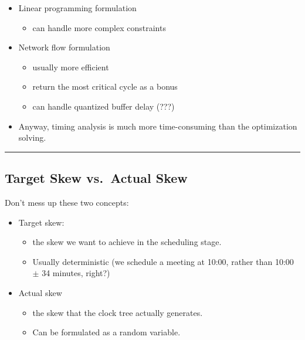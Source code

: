 \documentclass[
]{article}
\providecommand{\tightlist}{%
  \setlength{\itemsep}{0pt}\setlength{\parskip}{0pt}}
\begin{document}
\begin{itemize}
\tightlist
\item
  Linear programming formulation

  \begin{itemize}
  \tightlist
  \item
    can handle more complex constraints
  \end{itemize}
\item
  Network flow formulation

  \begin{itemize}
  \tightlist
  \item
    usually more efficient
  \item
    return the most critical cycle as a bonus
  \item
    can handle quantized buffer delay (???)
  \end{itemize}
\item
  Anyway, timing analysis is much more time-consuming than the
  optimization solving.
\end{itemize}

\begin{center}\rule{0.5\linewidth}{0.5pt}\end{center}

\subsection{Target Skew vs.~Actual Skew}\label{target-skew-vs.-actual-skew}

Don't mess up these two concepts:

\begin{itemize}
\tightlist
\item
  Target skew:

  \begin{itemize}
  \tightlist
  \item
    the skew we want to achieve in the scheduling stage.
  \item
    Usually deterministic (we schedule a meeting at 10:00, rather
    than 10:00 \(\pm\) 34 minutes, right?)
  \end{itemize}
\item
  Actual skew

  \begin{itemize}
  \tightlist
  \item
    the skew that the clock tree actually generates.
  \item
    Can be formulated as a random variable.
  \end{itemize}
\end{itemize}
\end{document}
